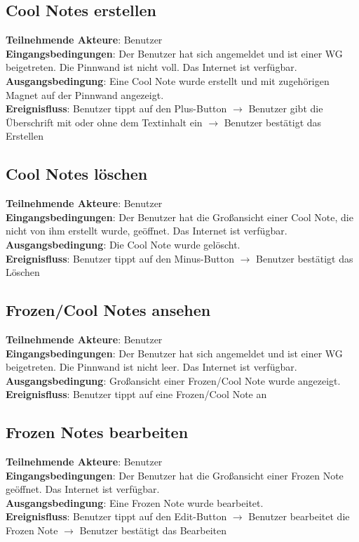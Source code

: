 \begin{flushleft}
		\subsection{Cool Notes erstellen}
		\textbf{Teilnehmende Akteure}: Benutzer \\
		\textbf{Eingangsbedingungen}: Der Benutzer hat sich angemeldet und ist einer WG beigetreten. Die Pinnwand ist nicht voll. Das Internet ist verfügbar. \\
		\textbf{Ausgangsbedingung}: Eine Cool Note wurde erstellt und mit zugehörigen Magnet auf der Pinnwand angezeigt. \\
		\textbf{Ereignisfluss}: Benutzer tippt auf den Plus-Button $\rightarrow$ Benutzer gibt die Überschrift mit oder ohne dem Textinhalt ein $\rightarrow$ Benutzer bestätigt das Erstellen
		
		\subsection{Cool Notes löschen}
		\textbf{Teilnehmende Akteure}: Benutzer \\
		\textbf{Eingangsbedingungen}: Der Benutzer hat die Großansicht einer Cool Note, die nicht von ihm erstellt wurde, geöffnet. Das Internet ist verfügbar. \\
		\textbf{Ausgangsbedingung}: Die Cool Note wurde gelöscht. \\
		\textbf{Ereignisfluss}: Benutzer tippt auf den Minus-Button $\rightarrow$ Benutzer bestätigt das Löschen
		
		\subsection{Frozen/Cool Notes ansehen}
		\textbf{Teilnehmende Akteure}: Benutzer \\
		\textbf{Eingangsbedingungen}: Der Benutzer hat sich angemeldet und ist einer WG beigetreten. Die Pinnwand ist nicht leer. Das Internet ist verfügbar. \\
		\textbf{Ausgangsbedingung}: Großansicht einer Frozen/Cool Note wurde angezeigt. \\
		\textbf{Ereignisfluss}: Benutzer tippt auf eine Frozen/Cool Note an
		
		\subsection{Frozen Notes bearbeiten}
		\textbf{Teilnehmende Akteure}: Benutzer \\
		\textbf{Eingangsbedingungen}: Der Benutzer hat die Großansicht einer Frozen Note geöffnet. Das Internet ist verfügbar. \\
		\textbf{Ausgangsbedingung}: Eine Frozen Note wurde bearbeitet. \\
		\textbf{Ereignisfluss}: Benutzer tippt auf den Edit-Button $\rightarrow$ Benutzer bearbeitet die Frozen Note $\rightarrow$ Benutzer bestätigt das Bearbeiten
		

\end{flushleft}

